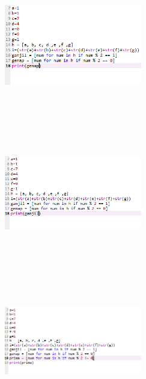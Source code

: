 \begin{enumerate}
\begin{figure}
\end{figure}
\begin{figure}
\item
\center
\includegraphics[width=6cm,height=6cm]{figures/c19.png}
\end{figure}
\begin{figure}
\item
\center
\includegraphics[width=6cm,height=6cm]{figures/c20.png}
\end{figure}
\begin{figure}
\item
\center
\includegraphics[width=6cm,height=6cm]{figures/c21.png}
\end{figure}
\end{enumerate}